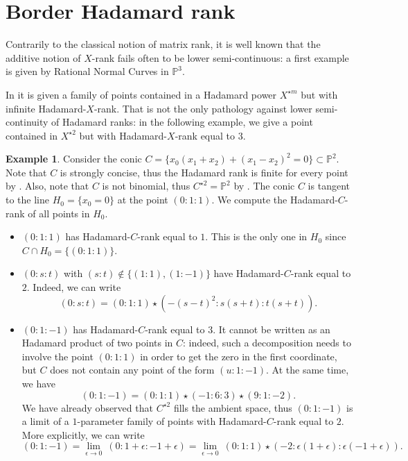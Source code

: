 \documentclass{amsart}
\theoremstyle{plain}
\numberwithin{theorem}{section}
\theoremstyle{definition}
\newtheorem{example}[theorem]{Example}
\newcommand{\bbP}{\mathbb{P}}
\begin{document}
\section{Border Hadamard rank}
Contrarily to the classical notion of matrix rank, it is well known that the additive notion of $X$-rank fails often to be lower semi-continuous: a first example is given by Rational Normal Curves in $\bbP^3$. 

In  it is given a family of points contained in a Hadamard power $X^{\star m}$ but with infinite Hadamard-$X$-rank. That is not the only pathology against lower semi-continuity of Hadamard ranks: in the following example, we give a point contained in $X^{\star 2}$ but with Hadamard-$X$-rank equal to $3$. 

\begin{example}\label{example:border_smallerthan_rank}
    Consider the conic $C = \{x_0(x_1+x_2) + (x_1-x_2)^2 = 0\} \subset \bbP^2$. Note that $C$ is strongly concise, thus the Hadamard rank is finite for every point by . Also, note that $C$ is not binomial, thus $C^{\star 2} = \bbP^2$ by . The conic $C$ is tangent to the line $H_0 = \{x_0 = 0\}$ at the point $(0:1:1)$. We compute the Hadamard-$C$-rank of all points in $H_0$.
    \begin{itemize}
        \item $(0:1:1)$ has Hadamard-$C$-rank equal to $1$. This is the only one in $H_0$ since $C \cap H_0 = \{(0:1:1)\}$.
        \item $(0:s:t)$ with $(s:t) \not\in \{(1:1),(1:-1)\}$ have Hadamard-$C$-rank equal to $2$. Indeed, we can write 
        \[
            (0:s:t) = (0:1:1) \star (-(s-t)^2 : s(s+t) : t(s+t)). 
        \]
        \item $(0:1:-1)$ has Hadamard-$C$-rank equal to $3$. It cannot be written as an Hadamard product of two points in $C$: indeed, such a decomposition needs to involve the point $(0:1:1)$ in order to get the zero in the first coordinate, but $C$ does not contain any point of the form $(u:1:-1)$. At the same time, we have 
        \[
            (0:1:-1) = (0:1:1) \star (-1:6:3) \star(9:1:-2).
        \]
        We have already observed that $C^{\star 2}$ fills the ambient space, thus $(0:1:-1)$ is a limit of a $1$-parameter family of points with Hadamard-$C$-rank equal to $2$. More explicitly, we can write
        \[
            (0:1:-1) = \lim_{\epsilon \rightarrow 0} ~(0:1+\epsilon:-1+\epsilon) = \lim_{\epsilon \rightarrow 0} ~(0:1:1) \star (-2:\epsilon(1+\epsilon):\epsilon(-1+\epsilon)).
        \]
    \end{itemize}
\end{example}
\end{document}
